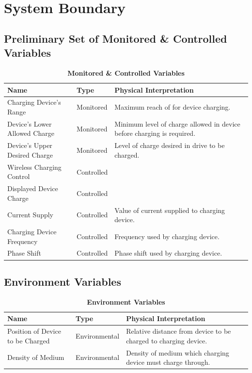 \documentclass[12pt, titlepage]{article}
\begin{document}
\section{System Boundary}
\subsection{Preliminary Set of Monitored \& Controlled Variables}
\begin{table}[H]
\caption{\bf Monitored \& Controlled Variables}
    \begin{tabular}{|p{4cm}|p{3cm}|p{7cm}|}
         \hline
         \bf Name & \bf Type & \bf Physical Interpretation\\
         \hline
         Charging Device's Range & Monitored & Maximum reach of for device charging.\\
         \hline
         Device's Lower Allowed Charge & Monitored & Minimum level of charge allowed in device before charging is required.\\
         \hline
         Device's Upper Desired Charge & Monitored & Level of charge desired in drive to be charged.\\
         \hline
         Wireless Charging Control & Controlled & \\
         \hline
         Displayed Device Charge & Controlled & \\
         \hline
         Current Supply & Controlled & Value of current supplied to charging device.\\
         \hline
         Charging Device Frequency & Controlled & Frequency used by charging device.\\
         \hline
         Phase Shift & Controlled & Phase shift used by charging device.\\
         \hline
    \end{tabular}
\end{table}


\subsection{Environment Variables}
\begin{table}[H]
\caption{\bf Environment Variables}
\begin{tabular}{ |p{4cm}|p{3cm}|p{7cm}|} 
 \hline
\bf Name & \bf Type & \bf Physical Interpretation\\
 \hline
 Position of Device to be Charged & Environmental & Relative distance from device to be charged to charging device.\\
 \hline
 Density of Medium & Environmental & Density of medium which charging device must charge through.\\
\hline
\end{tabular}
\end{table}
\end{document}
